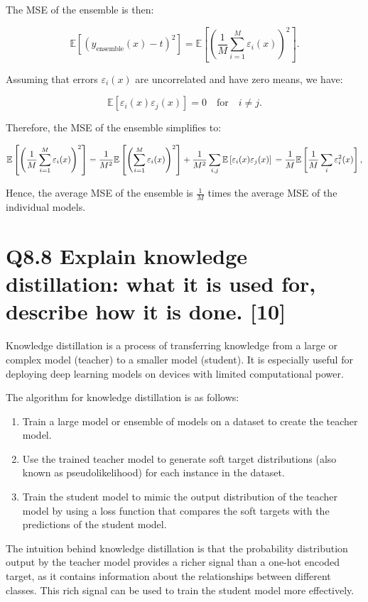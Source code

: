 \documentclass[11pt]{article}
\begin{document}
The MSE of the ensemble is then:

\[
\mathbb{E}\left[\left(y_{\text{ensemble}}(x) - t\right)^2\right] = \mathbb{E}\left[\left(\frac{1}{M} \sum_{i=1}^{M} \varepsilon_i(x)\right)^2\right].
\]

Assuming that errors \( \varepsilon_i(x) \) are uncorrelated and have zero means, we have:

\[
\mathbb{E}\left[\varepsilon_i(x)\varepsilon_j(x)\right] = 0 \quad \text{for} \quad i \neq j.
\]

Therefore, the MSE of the ensemble simplifies to:

\[
\mathbb{E}\left[\left(\frac{1}{M} \sum_{i=1}^{M} \varepsilon_i(x)\right)^2\right] = \frac{1}{M^2} \mathbb{E}\left[\left(\sum_{i=1}^{M} \varepsilon_i(x)\right)^2\right] + \frac{1}{M^2} \sum_{i, j} \mathbb{E}\left[\varepsilon_i(x)\varepsilon_j(x)\right] \\
= \frac{1}{M}\mathbb{E}\left[\frac{1}{M}\sum_{i}\varepsilon_{i}^{2}(x)\right],
\]

Hence, the average MSE of the ensemble is \( \frac{1}{M} \) times the average MSE of the individual models.

\section{Q8.8 Explain knowledge distillation: what it is used for, describe how it is done. [10]}

Knowledge distillation is a process of transferring knowledge from a large or complex model (teacher) to a smaller model (student). It is especially useful for deploying deep learning models on devices with limited computational power.

The algorithm for knowledge distillation is as follows:
\begin{enumerate}
    \item Train a large model or ensemble of models on a dataset to create the teacher model.
    \item Use the trained teacher model to generate soft target distributions (also known as pseudolikelihood) for each instance in the dataset.
    \item Train the student model to mimic the output distribution of the teacher model by using a loss function that compares the soft targets with the predictions of the student model.
\end{enumerate}

The intuition behind knowledge distillation is that the probability distribution output by the teacher model provides a richer signal than a one-hot encoded target, as it contains information about the relationships between different classes. This rich signal can be used to train the student model more effectively.
\end{document}
